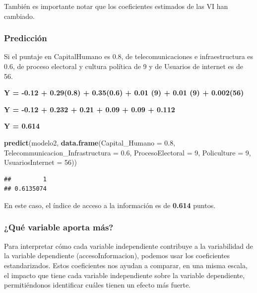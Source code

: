 \documentclass[
]{article}
\newenvironment{Shaded}{\begin{snugshade}}{\end{snugshade}}
\newcommand{\AttributeTok}[1]{\textcolor[rgb]{0.13,0.29,0.53}{#1}}
\newcommand{\DecValTok}[1]{\textcolor[rgb]{0.00,0.00,0.81}{#1}}
\newcommand{\FloatTok}[1]{\textcolor[rgb]{0.00,0.00,0.81}{#1}}
\newcommand{\FunctionTok}[1]{\textcolor[rgb]{0.13,0.29,0.53}{\textbf{#1}}}
\newcommand{\NormalTok}[1]{#1}
\begin{document}
También es importante notar que los coeficientes estimados de las VI han
cambiado.

\subsubsection{\texorpdfstring{\textbf{Predicción}}{Predicción}}\label{predicciuxf3n}

Si el puntaje en CapitalHumano es 0.8, de telecomunicaciones e
infraestructura es 0.6, de proceso electoral y cultura política de 9 y
de Usuarios de internet es de 56.

\textbf{Y = -0.12 + 0.29(0.8) + 0.35(0.6) + 0.01 (9) + 0.01 (9) +
0.002(56)}

\textbf{Y = -0.12 + 0.232 + 0.21 + 0.09 + 0.09 + 0.112}

\textbf{Y = 0.614}

\begin{Shaded}
\begin{Highlighting}[]
\FunctionTok{predict}\NormalTok{(modelo2, }\FunctionTok{data.frame}\NormalTok{(}\AttributeTok{Capital\_Humano =} \FloatTok{0.8}\NormalTok{, }\AttributeTok{Telecommunicacion\_Infrastructura =} \FloatTok{0.6}\NormalTok{, }\AttributeTok{ProcesoElectoral =} \DecValTok{9}\NormalTok{, }\AttributeTok{Policulture =} \DecValTok{9}\NormalTok{, }\AttributeTok{UsuariosInternet =} \DecValTok{56}\NormalTok{))}
\end{Highlighting}
\end{Shaded}

\begin{verbatim}
##         1 
## 0.6135074
\end{verbatim}

En este caso, el índice de acceso a la información es de \textbf{0.614}
puntos.

\subsubsection{\texorpdfstring{\textbf{¿Qué variable aporta
más?}}{¿Qué variable aporta más?}}\label{quuxe9-variable-aporta-muxe1s}

Para interpretar cómo cada variable independiente contribuye a la
variabilidad de la variable dependiente (accesoInformacion), podemos
usar los coeficientes estandarizados. Estos coeficientes nos ayudan a
comparar, en una misma escala, el impacto que tiene cada variable
independiente sobre la variable dependiente, permitiéndonos identificar
cuáles tienen un efecto más fuerte.
\end{document}
